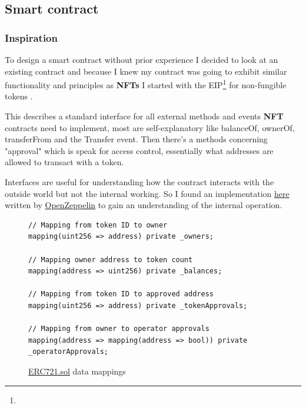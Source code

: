 \subsection{Smart contract}
\label{sec:smart-contract-design}
\subsubsection{Inspiration}

To design a smart contract without prior experience I decided to look at an existing contract and because I knew my contract was going to exhibit similar functionality and principles as \textbf{NFTs} I started with the EIP\footnote{} for non-fungible tokens \nft. 

This describes a standard interface for all external methods and events \textbf{NFT} contracts need to implement, most are self-explanatory like balanceOf, ownerOf, transferFrom and the Transfer event. Then there's a methods concerning "approval" which is  speak for access control, essentially what addresses are allowed to transact with a token.

Interfaces are useful for understanding how the contract interacts with the outside world but not the internal working. So I found an implementation \href{https://github.com/OpenZeppelin/openzeppelin-contracts/blob/master/contracts/token/ERC721/ERC721.sol}{here} written by \href{https://github.com/OpenZeppelin}{OpenZeppelin} to gain an understanding of the internal operation.

\begin{figure}[H]
\caption{\href{https://github.com/OpenZeppelin/openzeppelin-contracts/blob/master/contracts/token/ERC721/ERC721.sol}{ERC721.sol} data mappings}
\centering
\begin{lstlisting}[language=Solidity]
// Mapping from token ID to owner 
mapping(uint256 => address) private _owners;

// Mapping owner address to token count
mapping(address => uint256) private _balances;

// Mapping from token ID to approved address
mapping(uint256 => address) private _tokenApprovals;

// Mapping from owner to operator approvals
mapping(address => mapping(address => bool)) private _operatorApprovals;
\end{lstlisting}
\end{figure}

